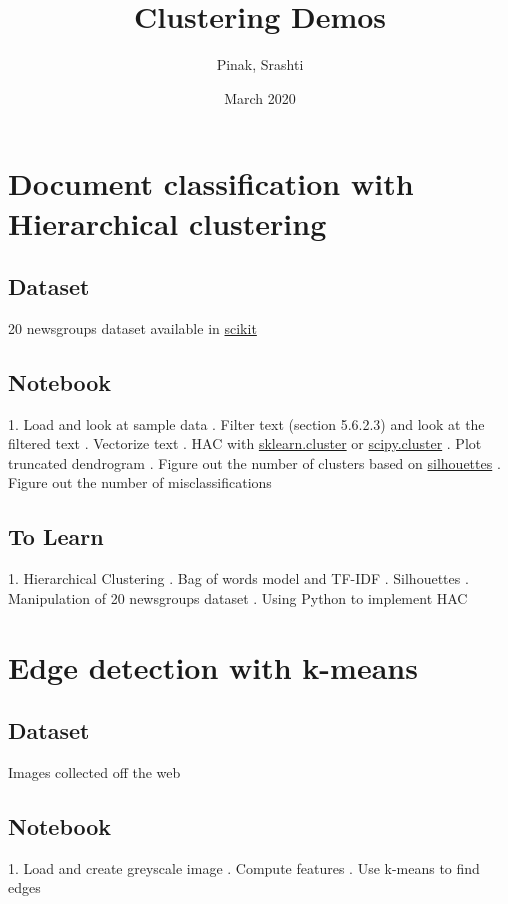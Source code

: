 \documentclass{article}
\title{Clustering Demos}
\author{Pinak, Srashti }
\date{March 2020}
\begin{document}
\maketitle

\section*{Document classification with Hierarchical clustering}
\subsection*{Dataset}
20 newsgroups dataset available in  \href{https://scikit-learn.org/0.19/datasets/twenty_newsgroups.html}{scikit}
\subsection*{Notebook}
1. Load and look at sample data
. Filter text (section 5.6.2.3) and look at the filtered text
. Vectorize text
. HAC with \href{https://scikit-learn.org/stable/modules/generated/sklearn.cluster.AgglomerativeClustering.html}{sklearn.cluster} or \href{https://joernhees.de/blog/2015/08/26/scipy-hierarchical-clustering-and-dendrogram-tutorial/}{scipy.cluster}
. Plot truncated dendrogram
. Figure out the number of clusters based on \href{https://en.wikipedia.org/wiki/Silhouette_(clustering)}{silhouettes}
. Figure out the number of misclassifications
\subsection*{To Learn}
1. Hierarchical Clustering
. Bag of words model and TF-IDF
. Silhouettes
. Manipulation of 20 newsgroups dataset
. Using Python to implement HAC
\section*{Edge detection with k-means}
\subsection*{Dataset} Images collected off the web

\subsection*{Notebook}
1. Load and create greyscale image
. Compute features
. Use k-means to find edges
\end{document}
